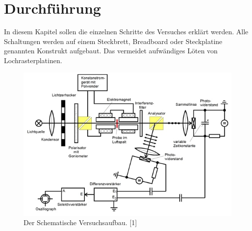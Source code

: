 \section{Durchführung}
\label{sec:Durchfuehrung}
In diesem Kapitel sollen die einzelnen Schritte des Versuches erklärt werden.
Alle Schaltungen werden auf einem Steckbrett, Breadboard oder Steckplatine genannten Konstrukt
aufgebaut. Das vermeidet aufwändiges Löten von Lochrasterplatinen.


\begin{figure}
    \centering
    \includegraphics[width=1\textwidth]{content/grafiken/versuchsaufbau.JPG}
    \caption{Der Schematische Versuchsaufbau. [1]}
    \label{fig:versuchsaufbau}
  \end{figure}
